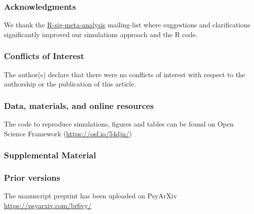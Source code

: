 \documentclass[
  man,floatsintext]{apa6}
\begin{document}
\newpage

\hypertarget{acknowledgments}{%
\subsubsection*{Acknowledgments}\label{acknowledgments}}

We thank the \href{https://stat.ethz.ch/mailman/listinfo/r-sig-meta-analysis}{R-sig-meta-analysis} mailing-list where suggestions and clarifications significantly improved our simulations approach and the R code.

\hypertarget{conflicts-of-interest}{%
\subsubsection*{Conflicts of Interest}\label{conflicts-of-interest}}

The author(s) declare that there were no conflicts of interest with respect to the authorship or the publication of this article.

\hypertarget{data-materials-and-online-resources}{%
\subsubsection*{Data, materials, and online resources}\label{data-materials-and-online-resources}}

The code to reproduce simulations, figures and tables can be found on Open Science Framework (\url{https://osf.io/54djn/})

\hypertarget{supplemental-material}{%
\subsubsection*{Supplemental Material}\label{supplemental-material}}

\hypertarget{prior-versions}{%
\subsubsection*{Prior versions}\label{prior-versions}}

The manuscript preprint has been uploaded on PsyArXiv \url{https://psyarxiv.com/br6vy/}
\end{document}
